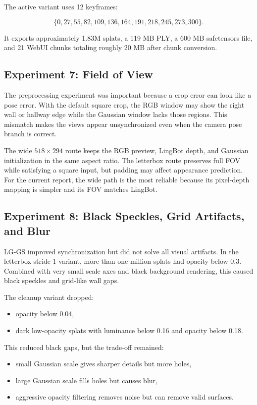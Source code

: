 \documentclass[11pt]{article}
\newcommand{\methodabbr}{LG-GS}
\newcommand{\RouteB}{\methodabbr\xspace}
\begin{document}
The active variant uses 12 keyframes:

\begin{equation}
\{0, 27, 55, 82, 109, 136, 164, 191, 218, 245, 273, 300\}.
\end{equation}

It exports approximately 1.83M splats, a 119 MB PLY, a 600 MB safetensors file, and 21 WebUI chunks totaling roughly 20 MB after chunk conversion.

\subsection{Experiment 7: Field of View}

The preprocessing experiment was important because a crop error can look like a pose error. With the default square crop, the RGB window may show the right wall or hallway edge while the Gaussian window lacks those regions. This mismatch makes the views appear unsynchronized even when the camera pose branch is correct.

The wide \(518 \times 294\) route keeps the RGB preview, LingBot depth, and Gaussian initialization in the same aspect ratio. The letterbox route preserves full FOV while satisfying a square input, but padding may affect appearance prediction. For the current report, the wide path is the most reliable because its pixel-depth mapping is simpler and its FOV matches LingBot.

\subsection{Experiment 8: Black Speckles, Grid Artifacts, and Blur}

\RouteB improved synchronization but did not solve all visual artifacts. In the letterbox stride-1 variant, more than one million splats had opacity below 0.3. Combined with very small scale axes and black background rendering, this caused black speckles and grid-like wall gaps.

The cleanup variant dropped:

\begin{itemize}
    \item opacity below 0.04,
    \item dark low-opacity splats with luminance below 0.16 and opacity below 0.18.
\end{itemize}

This reduced black gaps, but the trade-off remained:

\begin{itemize}
    \item small Gaussian scale gives sharper details but more holes,
    \item large Gaussian scale fills holes but causes blur,
    \item aggressive opacity filtering removes noise but can remove valid surfaces.
\end{itemize}
\end{document}
